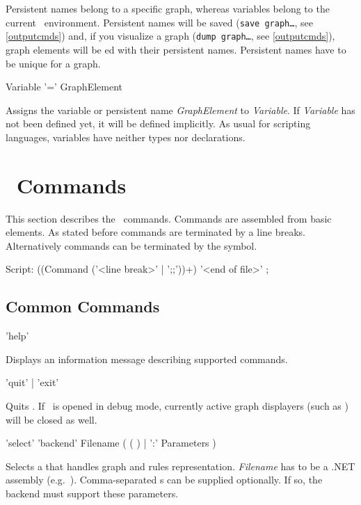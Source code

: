 \begin{note}
Persistent names belong to a specific graph, whereas variables belong to the current \GrShell\ environment. Persistent names will be saved (\texttt{save graph\dots}, see \ref{outputcmds}) and, if you visualize a graph (\texttt{dump graph\dots}, see \ref{outputcmds}), graph elements will be ed with their persistent names. Persistent names have to be unique for a graph.
\end{note}

\begin{rail}
  Variable '=' GraphElement   
\end{rail}
Assigns the variable or persistent name \emph{GraphElement} to \emph{Variable}. If \emph{Variable} has not been defined yet, it will be defined implicitly. As usual for scripting languages, variables have neither types nor declarations.

\section{\GrShell\ Commands}
This section describes the \GrShell\ commands. Commands are assembled from basic elements. As stated before commands are terminated by a line breaks. Alternatively commands can be terminated by the \indexed{\texttt{;;}} symbol.
\begin{rail}
  Script: ((Command ('<line break>' | ';;'))+) '<end of file>' ;
\end{rail}

\subsection{Common Commands}
\label{commcommands}
\begin{rail}
  'help'
\end{rail}
Displays an information message describing supported commands. 

\begin{rail}
  'quit' | 'exit'
\end{rail}
Quits \GrShell. If \GrShell\ is opened in debug mode, currently active graph displayers (such as \yComp) will be closed as well.

\begin{rail}
  'select' 'backend' Filename ( ( ) | ':' Parameters )
\end{rail}
Selects a  that handles graph and rules representation. \emph{Filename} has to be a .NET assembly (e.g.\ \texttt{}).
Comma-separated s can be supplied optionally. If so, the backend must support these parameters.

